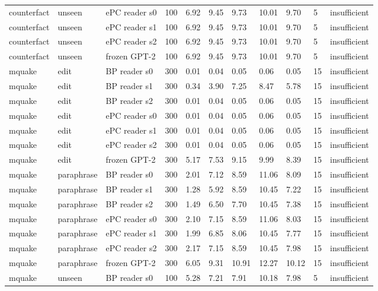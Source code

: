 \documentclass[10pt,a4paper]{article}
\begin{document}
\begin{center}
\begin{tabularx}{\textwidth}{@{}p{}XXXXXXXXXX@{}}
counterfact & unseen & ePC reader s0 & 100 & 6.92 & 9.45 & 9.73 & 10.01 & 9.70 & 5 & insufficient \\
counterfact & unseen & ePC reader s1 & 100 & 6.92 & 9.45 & 9.73 & 10.01 & 9.70 & 5 & insufficient \\
counterfact & unseen & ePC reader s2 & 100 & 6.92 & 9.45 & 9.73 & 10.01 & 9.70 & 5 & insufficient \\
counterfact & unseen & frozen GPT-2 & 100 & 6.92 & 9.45 & 9.73 & 10.01 & 9.70 & 5 & insufficient \\
mquake & edit & BP reader s0 & 300 & 0.01 & 0.04 & 0.05 & 0.06 & 0.05 & 15 & insufficient \\
mquake & edit & BP reader s1 & 300 & 0.34 & 3.90 & 7.25 & 8.47 & 5.78 & 15 & insufficient \\
mquake & edit & BP reader s2 & 300 & 0.01 & 0.04 & 0.05 & 0.06 & 0.05 & 15 & insufficient \\
mquake & edit & ePC reader s0 & 300 & 0.01 & 0.04 & 0.05 & 0.06 & 0.05 & 15 & insufficient \\
mquake & edit & ePC reader s1 & 300 & 0.01 & 0.04 & 0.05 & 0.06 & 0.05 & 15 & insufficient \\
mquake & edit & ePC reader s2 & 300 & 0.01 & 0.04 & 0.05 & 0.06 & 0.05 & 15 & insufficient \\
mquake & edit & frozen GPT-2 & 300 & 5.17 & 7.53 & 9.15 & 9.99 & 8.39 & 15 & insufficient \\
mquake & paraphrase & BP reader s0 & 300 & 2.01 & 7.12 & 8.59 & 11.06 & 8.09 & 15 & insufficient \\
mquake & paraphrase & BP reader s1 & 300 & 1.28 & 5.92 & 8.59 & 10.45 & 7.22 & 15 & insufficient \\
mquake & paraphrase & BP reader s2 & 300 & 1.49 & 6.50 & 7.70 & 10.45 & 7.38 & 15 & insufficient \\
mquake & paraphrase & ePC reader s0 & 300 & 2.10 & 7.15 & 8.59 & 11.06 & 8.03 & 15 & insufficient \\
mquake & paraphrase & ePC reader s1 & 300 & 1.99 & 6.85 & 8.06 & 10.45 & 7.77 & 15 & insufficient \\
mquake & paraphrase & ePC reader s2 & 300 & 2.17 & 7.15 & 8.59 & 10.45 & 7.98 & 15 & insufficient \\
mquake & paraphrase & frozen GPT-2 & 300 & 6.05 & 9.31 & 10.91 & 12.27 & 10.12 & 15 & insufficient \\
mquake & unseen & BP reader s0 & 100 & 5.28 & 7.21 & 7.91 & 10.18 & 7.98 & 5 & insufficient \\

\end{tabularx}
\end{center}
\end{document}
